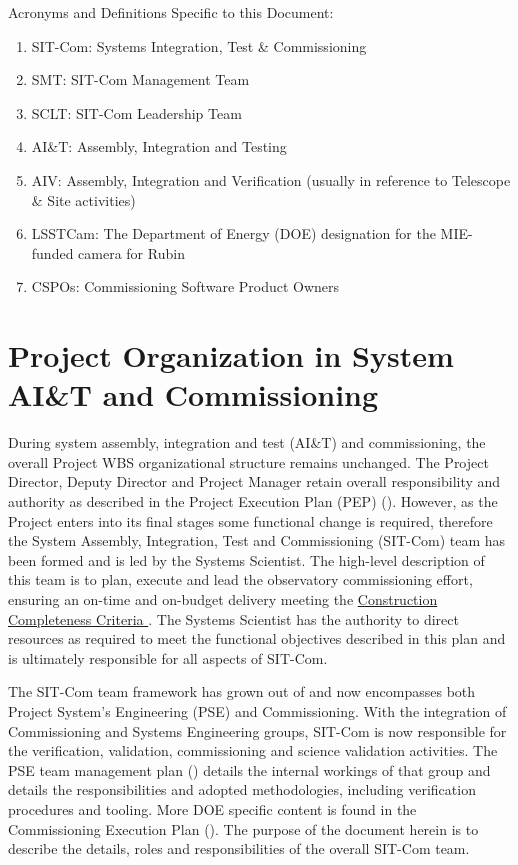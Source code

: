 \documentclass[SE,lsstdraft,authoryear,toc]{lsstdoc}
\begin{document}
Acronyms and Definitions Specific to this Document:
\begin{enumerate}
    \item SIT-Com: Systems Integration, Test \& Commissioning
    \item SMT: SIT-Com Management Team
    \item SCLT: SIT-Com Leadership Team
    \item AI\&T: Assembly, Integration and Testing
    \item AIV: Assembly, Integration and Verification (usually in reference to Telescope \& Site activities)
    \item LSSTCam: The Department of Energy (DOE) designation for the MIE-funded camera for Rubin
    \item CSPOs: Commissioning Software Product Owners
\end{enumerate}

\section{Project Organization in System AI\&T and Commissioning}
\label{sec:project_organization}

During system assembly, integration and test (AI\&T) and commissioning, the overall Project WBS organizational structure remains unchanged.
The Project Director, Deputy Director and Project Manager retain overall responsibility and authority as described in the Project Execution Plan (PEP) ().
However, as the Project enters into its final stages some functional change is required, therefore the System Assembly, Integration, Test and Commissioning (SIT-Com) team has been formed and is led by the Systems Scientist.
The high-level description of this team is to plan, execute and lead the observatory commissioning effort, ensuring an on-time and on-budget delivery meeting the \href{https://sitcomtn-005.lsst.io}{Construction Completeness Criteria }.
The Systems Scientist has the authority to direct resources as required to meet the functional objectives described in this plan and is ultimately responsible for all aspects of SIT-Com.

The SIT-Com team framework has grown out of and now encompasses both Project System's Engineering (PSE) and Commissioning.
With the integration of Commissioning and Systems Engineering groups, SIT-Com is now responsible for the verification, validation, commissioning and science validation activities.
The PSE team management plan () details the internal workings of that group and details the responsibilities and adopted methodologies, including verification procedures and tooling.
More DOE specific content is found in the Commissioning Execution Plan ().
The purpose of the document herein is to describe the details, roles and responsibilities of the overall SIT-Com team.
\end{document}
